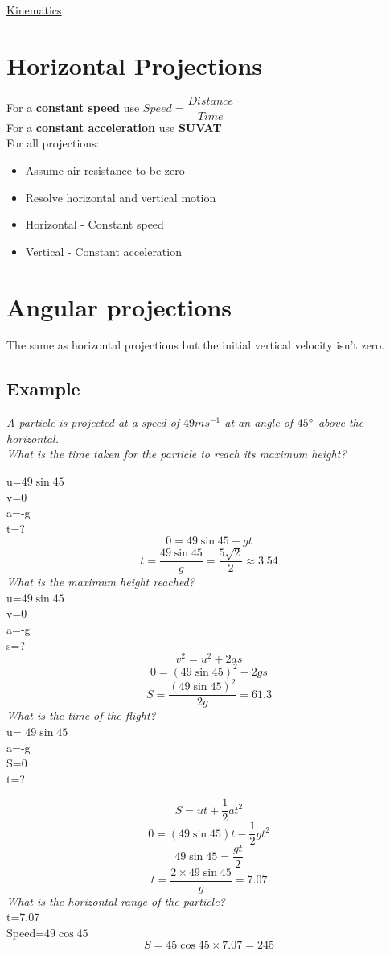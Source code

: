 \documentclass{article}[18pt]
\begin{document}
\begin{center}
\underline{\huge Kinematics}
\end{center}
\section{Horizontal Projections}
For a \textbf{constant speed} use \textbf{$Speed=\dfrac{Distance}{Time}$}\\
For a \textbf{constant acceleration} use \textbf{SUVAT}\\
For all projections:
\begin{itemize}
\item Assume air resistance to be zero
\item Resolve horizontal and vertical motion
\item Horizontal - Constant speed
\item Vertical - Constant acceleration
\end{itemize}
\section{Angular projections}
The same as horizontal projections but the initial vertical velocity isn't zero.
\subsection{Example}
\textit{A particle is projected at a speed of $49ms^{-1}$ at an angle of $45 \degree$ above the horizontal.}\\
\textit{What is the time taken for the particle to reach its maximum height?}

u=$49\sin45$\\
v=0\\
a=-g\\
t=?
$$0=49\sin45-gt$$
$$t=\dfrac{49\sin45}{g}=\dfrac{5\sqrt{2}}{2}\approx3.54$$
\textit{What is the maximum height reached?}\\
u=$49\sin45$\\
v=0\\
a=-g\\
s=?
$$v^2=u^2+2as$$
$$0=(49\sin45)^2-2gs$$
$$S=\dfrac{(49\sin45)^2}{2g}=61.3$$
\textit{What is the time of the flight?}\\
u= $49\sin45$\\
a=-g\\
S=0\\
t=?

$$S=ut+\dfrac{1}{2}at^2$$
$$0=(49\sin45)t-\dfrac{1}{2}gt^2$$
$$49\sin45=\dfrac{gt}{2}$$
$$t=\dfrac{2\times49\sin45}{g}=7.07$$
\textit{What is the horizontal range of the particle?}\\
t=7.07\\
Speed=$49\cos45$
$$S=45\cos45\times7.07=245$$
\end{document}
